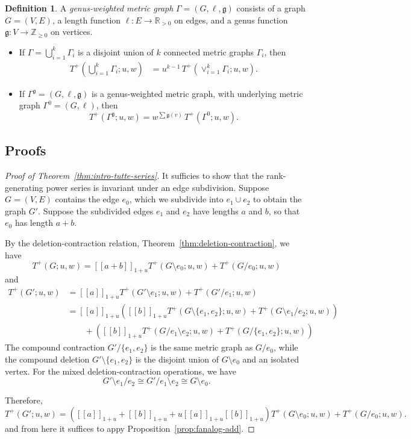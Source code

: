 \documentclass{amsart}
\theoremstyle{definition}
\newtheorem{dfn}[thm]{Definition}
\newcommand{\RR}{\mathbb{R}}
\newcommand{\ZZ}{\mathbb{Z}}
\newcommand{\fg}{\mathfrak{g}}
\newcommand{\RRpos}{\RR_{>0}}
\newcommand{\fanalog}[2]{[\![#2]\!]_{#1}}
\begin{document}
\begin{dfn}
A {\em genus-weighted metric graph}
$\Gamma = (G,\ell, \fg)$
consists of a graph $G = (V,E)$,
a length function $\ell : E \to \RRpos$ on edges,
and a genus function
$\fg: V \to \ZZ_{\geq 0}$ on vertices.
\end{dfn}

\begin{itemize}
\item
If $\Gamma = \bigcup_{i=1}^k \Gamma_i$ is a disjoint union of $k$ connected metric graphs $\Gamma_i$,
then 
\begin{align*}
T^+\left(\bigcup_{i=1}^k \Gamma_i ; u,w \right) 
&= u^{k-1}\, T^+\left(\vee_{i=1}^k \Gamma_i; u,w \right) .
\end{align*}

\item
If $\Gamma^{\fg} = (G,\ell,\fg)$ is a genus-weighted metric graph,
with underlying metric graph $\Gamma^0 = (G,\ell)$,
then
\[
	T^+(\Gamma^{\fg}; u,w) = w^{\sum \fg(v)} \, T^+(\Gamma^0; u,w).
\]
\end{itemize}

\subsection{Proofs}

\begin{proof}[Proof of Theorem~\ref{thm:intro-tutte-series}]
It sufficies to show that the rank-generating power series is invariant 
under an edge subdivision.
Suppose $G = (V,E)$ contains the edge $e_0$, which we subdivide into $e_1 \cup e_2$ to obtain the graph $G'$.
Suppose the subdivided edges $e_1$ and $e_2$ have lengths $a$ and $b$, so that $e_0$ has length $a + b$.

By the deletion-contraction relation, Theorem~\ref{thm:deletion-contraction},
we have
\[
	T^+(G; u,w) = \fanalog{1 + u}{a + b} T^+(G\setminus e_0; u,w) + T^+(G/e_0; u,w)
\]
and 
\begin{align*}
	T^+(G'; u,w) &= \fanalog{1 + u}{a} T^+(G'\setminus e_1; u,w) + T^+(G'/e_1; u,w)\\
	&= \fanalog{1 + u}{a}\left(\fanalog{1 + u}{b} T^+(G\setminus\{e_1,e_2\}; u,w) + T^+(G \setminus e_1 / e_2; u,w)\right) \\
	&\qquad + \left(\fanalog{1 + u}{b} T^+(G/e_1 \setminus e_2; u,w) + T^+(G/\{e_1,e_2\}; u,w) \right)
\end{align*}
The compound contraction $G' / \{e_1, e_2\}$ is the same metric graph as $G / e_0$,
while the compound deletion $G' \setminus \{e_1, e_2\}$ is the disjoint union of 
$G \setminus e_0$ and an isolated vertex.
For the mixed deletion-contraction operations, we have
\[
	G' \setminus e_1 / e_2 \cong G' / e_1 \setminus e_2 \cong G \setminus e_0.
\]

Therefore,
\[
	T^+(G'; u,w) = (\fanalog{1 + u}{a} + \fanalog{1 + u}{b} + u\fanalog{1 + u}{a}\fanalog{1 + u}{b}) T^+(G\setminus e_0; u,w) + T^+(G/e_0; u,w) .
\]
and from here it suffices to appy Proposition~\ref{prop:fanalog-add}.
\end{proof}
\end{document}
